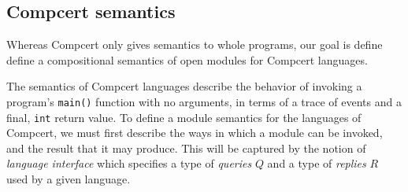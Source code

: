\documentclass[11pt]{article}
\begin{document}
%
%
%

\subsection{Compcert semantics}

Whereas Compcert only gives semantics to whole programs,
our goal is define define a compositional semantics
of open modules for Compcert languages.

The semantics of Compcert languages describe
the behavior of invoking a program's \texttt{main()} function
with no arguments,
in terms of a trace of events and a final, \texttt{int} return value.
To define a module semantics for the languages of Compcert,
we must first describe the ways in which a module can be invoked,
and the result that it may produce.
This will be captured by the notion of \emph{language interface}
which specifies a type of \emph{queries} $Q$ and a type of \emph{replies} $R$
used by a given language.
\end{document}
